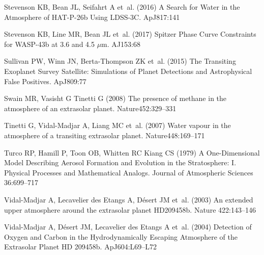 \documentclass[graybox,natbib,nosecnum]{svmult}
\newcommand*\aj{AJ}
\newcommand*\apj{ApJ}
\newcommand*\apjl{ApJ}
\newcommand*\nat{Nature}
\begin{document}
\begin{thebibliography}{110}
{Stevenson} KB, {Bean} JL, {Seifahrt} A et~al. (2016) {A Search for Water in
  the Atmosphere of HAT-P-26b Using LDSS-3C}. \apj 817:141

{Stevenson} KB, {Line} MR, {Bean} JL et~al. (2017) {Spitzer Phase Curve
  Constraints for WASP-43b at 3.6 and 4.5 {$\mu$}m}. \aj 153:68

{Sullivan} PW, {Winn} JN, {Berta-Thompson} ZK et~al. (2015) {The Transiting
  Exoplanet Survey Satellite: Simulations of Planet Detections and
  Astrophysical False Positives}. \apj 809:77

{Swain} MR, {Vasisht} G {Tinetti} G (2008) {The presence of methane in the
  atmosphere of an extrasolar planet}. \nat 452:329--331

{Tinetti} G, {Vidal-Madjar} A, {Liang} MC et~al. (2007) {Water vapour in the
  atmosphere of a transiting extrasolar planet}. \nat 448:169--171

{Turco} RP, {Hamill} P, {Toon} OB, {Whitten} RC {Kiang} CS (1979) {A
  One-Dimensional Model Describing Aerosol Formation and Evolution in the
  Stratosphere: I. Physical Processes and Mathematical Analogs.} Journal of
  Atmospheric Sciences 36:699--717

{Vidal-Madjar} A, {Lecavelier des Etangs} A, {D{\'e}sert} JM et~al. (2003) {An
  extended upper atmosphere around the extrasolar planet HD209458b}. \nat
  422:143--146

{Vidal-Madjar} A, {D{\'e}sert} JM, {Lecavelier des Etangs} A et~al. (2004)
  {Detection of Oxygen and Carbon in the Hydrodynamically Escaping Atmosphere
  of the Extrasolar Planet HD 209458b}. \apjl 604:L69--L72


\end{thebibliography}
\end{document}
